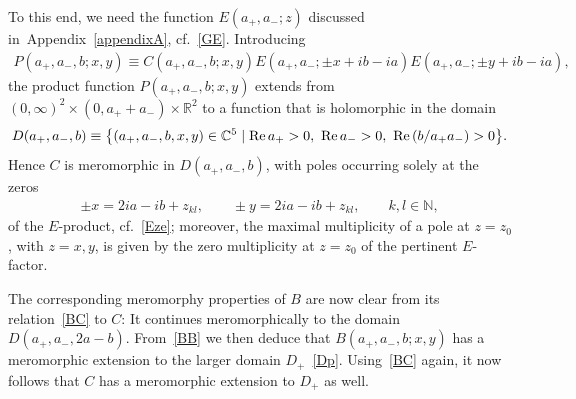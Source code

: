 \documentclass[11pt]{article}
\numberwithin{equation}{section}
\newcommand{\N}{{\mathbb N}}
\newcommand{\C}{{\mathbb C}}
\newcommand{\R}{{\mathbb R}}
\newcommand{\re}{{\rm Re}\, }
\newcommand{\aaa}{a_{+},a_{-}}
\begin{document}
To this end, we need the function $E(\aaa;z)$ discussed in~Appendix~\ref{appendixA}, cf.~\eqref{GE}. Introducing
\begin{gather}\label{P}
P(\aaa,b;x,y)\equiv C(\aaa,b;x,y)E(\aaa;\pm x+ib-ia)E(\aaa;\pm y+ib-ia),\!\!\!\!
\end{gather}
the product function $P(\aaa,b;x,y)$ extends from $(0,\infty)^2\times (0,a_{+}+a_-)\times \R^2$ to a function that is holomorphic in the domain
\begin{gather}
D(\aaa,b)\equiv \big\{ (\aaa,b,x,y)\in \C^5 \mid \re a_+>0,\ \re a_->0, \ \re (b/a_+a_-)>0\big\}.
\end{gather}
 Hence $C$ is meromorphic in $D(\aaa,b)$, with poles occurring solely at the zeros
\begin{gather}
\pm x=2ia-ib+z_{kl},\qquad \pm y=2ia-ib+z_{kl},\qquad k,l\in\N,
\end{gather}
of the $E$-product, cf.~\eqref{Eze}; moreover, the maximal multiplicity of a pole at $z=z_0$, with $z=x,y$, is given by the zero multiplicity at $z=z_0$ of the pertinent $E$-factor.

The corresponding meromorphy properties of $B$ are now clear from its relation~\eqref{BC} to $C$: It continues meromorphically to the domain $D(\aaa,2a-b)$. From~\eqref{BB} we then deduce that $B(\aaa,b;x,y)$ has a meromorphic extension to the larger domain $D_+$~\eqref{Dp}.
Using~\eqref{BC} again, it now follows that $C$ has a meromorphic extension to $D_+$ as well.
\end{document}

